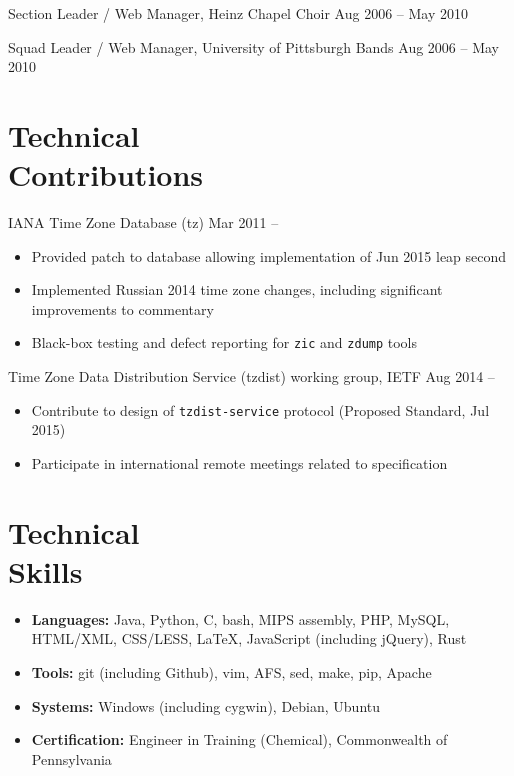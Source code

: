 \documentclass[11pt]{article}
\newcommand{\present}{\phantom{Xxx 20XX}}
\newcommand{\itemizeonly}{\leavevmode\par\vspace{\dimexpr-\baselineskip-\parskip}}
\begin{document}
\selectfont
Section Leader / Web Manager, Heinz Chapel Choir
	\hfill Aug 2006 -- May 2010
\normalfont

\selectfont
Squad Leader / Web Manager, University of Pittsburgh Bands
	\hfill Aug 2006 -- May 2010
\normalfont



\section{Technical\\ Contributions}

\selectfont
IANA Time Zone Database (tz)
	\hfill Mar 2011 -- \present
\normalfont
\begin{itemize}
	\item Provided patch to database allowing implementation of Jun 2015 leap second
	\item Implemented Russian 2014 time zone changes,
		including significant improvements to commentary
	\item Black-box testing and defect reporting for \texttt{zic} and \texttt{zdump} tools
\end{itemize}

\selectfont
Time Zone Data Distribution Service (tzdist) working group, IETF
	\hfill Aug 2014 -- \present
\normalfont
\begin{itemize}
	\item Contribute to design of \texttt{tzdist-service} protocol (Proposed Standard, Jul 2015)
	\item Participate in international remote meetings related to specification
\end{itemize}



\section{Technical\\ Skills}

\itemizeonly
\begin{itemize}
	\item \textbf{Languages:} Java, Python, C, bash, MIPS assembly, PHP, MySQL, HTML/XML, CSS/LESS,
		\LaTeX, JavaScript (including jQuery), Rust
	\item \textbf{Tools:} git (including Github), vim, AFS, sed, make, pip, Apache
	\item \textbf{Systems:} Windows (including cygwin), Debian, Ubuntu
	\item \textbf{Certification:} Engineer in Training (Chemical), Commonwealth of Pennsylvania
\end{itemize}
\end{document}
